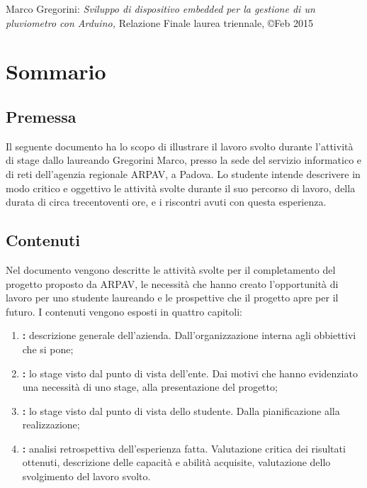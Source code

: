 \documentclass[11pt]{book}              %
\begin{document}
\newpage
\thispagestyle{empty}
\vspace*{\fill}

Marco Gregorini: \textit{Sviluppo di dispositivo embedded per la gestione di un pluviometro con Arduino,} Relazione Finale laurea triennale, \copyright Feb 2015

\newpage




\chapter*{Sommario}

\section*{Premessa}


Il seguente documento ha lo scopo di illustrare il lavoro svolto durante l'attività di stage dallo laureando Gregorini Marco, presso la sede del servizio informatico e di reti dell'agenzia regionale ARPAV, a Padova. Lo studente intende descrivere in modo critico e oggettivo le attività svolte durante il suo percorso di lavoro, della durata di circa trecentoventi ore, e i riscontri avuti con questa esperienza.

\section*{Contenuti}

Nel documento vengono descritte le attività svolte per il completamento del progetto proposto da ARPAV, le necessità che hanno creato l'opportunità di lavoro per uno studente laureando e le prospettive che il progetto apre per il futuro.
I contenuti vengono esposti in quattro capitoli:

\begin{enumerate}
	\item \textbf{:} descrizione generale dell'azienda. Dall'organizzazione interna agli obbiettivi che si pone;
	\item \textbf{:} lo stage visto dal punto di vista dell'ente. Dai motivi che hanno evidenziato una necessità di uno stage, alla presentazione del progetto;
	\item \textbf{:} lo stage visto dal punto di vista dello studente. Dalla pianificazione alla realizzazione;
	\item \textbf{:} analisi retrospettiva dell'esperienza fatta. Valutazione critica dei risultati ottenuti, descrizione delle capacità e abilità acquisite, valutazione dello svolgimento del lavoro svolto.
\end{enumerate}
\end{document}
